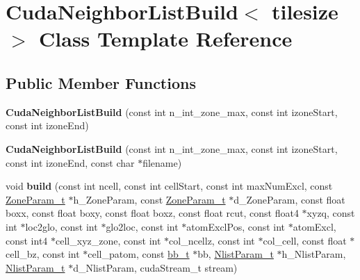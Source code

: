 \hypertarget{classCudaNeighborListBuild}{}\section{Cuda\+Neighbor\+List\+Build$<$ tilesize $>$ Class Template Reference}
\label{classCudaNeighborListBuild}
\subsection*{Public Member Functions}
\begin{DoxyCompactItemize}
\item 
\hypertarget{classCudaNeighborListBuild_af5bdc90d0ba8f34bae48bb6b07994e63}{}\label{classCudaNeighborListBuild_af5bdc90d0ba8f34bae48bb6b07994e63} 
{\bfseries Cuda\+Neighbor\+List\+Build} (const int n\+\_\+int\+\_\+zone\+\_\+max, const int izone\+Start, const int izone\+End)
\item 
\hypertarget{classCudaNeighborListBuild_ae96e56ea2910e0444c7441cdd9db2fbf}{}\label{classCudaNeighborListBuild_ae96e56ea2910e0444c7441cdd9db2fbf} 
{\bfseries Cuda\+Neighbor\+List\+Build} (const int n\+\_\+int\+\_\+zone\+\_\+max, const int izone\+Start, const int izone\+End, const char $\ast$filename)
\item 
\hypertarget{classCudaNeighborListBuild_a05f9d6a9a77c5fcab2453333155d0c04}{}\label{classCudaNeighborListBuild_a05f9d6a9a77c5fcab2453333155d0c04} 
void {\bfseries build} (const int ncell, const int cell\+Start, const int max\+Num\+Excl, const \hyperlink{structZoneParam__t}{Zone\+Param\+\_\+t} $\ast$h\+\_\+\+Zone\+Param, const \hyperlink{structZoneParam__t}{Zone\+Param\+\_\+t} $\ast$d\+\_\+\+Zone\+Param, const float boxx, const float boxy, const float boxz, const float rcut, const float4 $\ast$xyzq, const int $\ast$loc2glo, const int $\ast$glo2loc, const int $\ast$atom\+Excl\+Pos, const int $\ast$atom\+Excl, const int4 $\ast$cell\+\_\+xyz\+\_\+zone, const int $\ast$col\+\_\+ncellz, const int $\ast$col\+\_\+cell, const float $\ast$cell\+\_\+bz, const int $\ast$cell\+\_\+patom, const \hyperlink{structbb__t}{bb\+\_\+t} $\ast$bb, \hyperlink{structNlistParam__t}{Nlist\+Param\+\_\+t} $\ast$h\+\_\+\+Nlist\+Param, \hyperlink{structNlistParam__t}{Nlist\+Param\+\_\+t} $\ast$d\+\_\+\+Nlist\+Param, cuda\+Stream\+\_\+t stream)
\item 
\hypertarget{classCudaNeighborListBuild_a0d68fef441662e05ff6326de14dd7cf6}{}\label{classCudaNeighborListBuild_a0d68fef441662e05ff6326de14dd7cf6} 

\end{DoxyCompactItemize}
